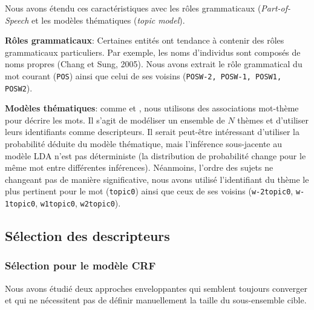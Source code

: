 Nous avons étendu ces caractéristiques avec les rôles grammaticaux (\textit{Part-of-Speech} et les modèles thématiques (\textit{topic model}).

\textbf{Rôles grammaticaux}: Certaines entités ont tendance à contenir des rôles grammaticaux particuliers. Par exemple, les noms d'individus sont composés de noms propres (Chang et Sung, 2005). Nous avons extrait le rôle grammatical du mot courant (\verb|POS|) ainsi que celui de ses voisins (\texttt{POSW-2, POSW-1, POSW1, POSW2}).

\textbf{Modèles thématiques}: comme \citet{polifroni2011usingLDA} et \citet{nallapati2010blinddomaintransferner}, nous utilisons des associations mot-thème pour décrire les mots. Il s'agit de modéliser un ensemble de $N$ thèmes et d'utiliser leurs identifiants comme descripteurs. Il serait peut-être intéressant d'utiliser la probabilité déduite du modèle thématique, mais l'inférence sous-jacente au modèle LDA \citep{blei2003lda} n'est pas déterministe (la distribution de probabilité change pour le même mot entre différentes inférences).
Néanmoins, l'ordre des sujets ne changeant pas de manière significative, nous avons utilisé l'identifiant du thème le plus pertinent pour le mot (\verb|topic0|) ainsi que ceux de ses voisins (\verb|w-2topic0|, \verb|w-1topic0|, \verb|w1topic0|, \verb|w2topic0|).

\subsection{Sélection des descripteurs}
\subsubsection{Sélection  pour le modèle CRF}
 Nous avons étudié deux approches enveloppantes qui semblent toujours converger et qui ne nécessitent pas de définir manuellement la taille du sous-ensemble cible. %

